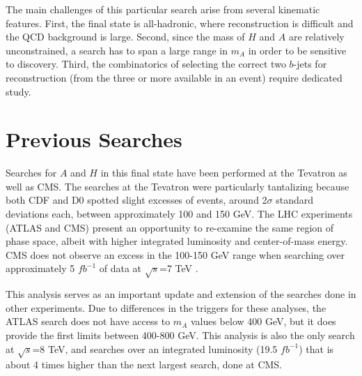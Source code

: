 The main challenges of this particular search arise from several kinematic features. 
First, the final state is all-hadronic, where reconstruction is difficult and 
the QCD background is large.  Second, since the mass of $H$ 
and $A$ are relatively unconstrained, a search has to span a large 
range in $m_A$ in order to be sensitive to discovery.  
Third, the combinatorics of selecting the correct two $b$-jets for reconstruction 
(from the three or more available in an event) require dedicated study.  


\section{Previous Searches}
Searches for $A$ and $H$ in this final state have been performed at the Tevatron
as well as CMS.  The searches at the 
Tevatron were particularly tantalizing because both CDF \cite{CDFbH} and D0 \cite{D0bH} spotted 
slight excesses of events, around 2$\sigma$ standard deviations each, between approximately
100 and 150 GeV.  The LHC experiments (ATLAS and CMS) present an opportunity to
re-examine the same region of phase space, albeit with higher integrated luminosity
and center-of-mass energy.  CMS does not observe an excess in the 100-150 GeV range 
when searching over approximately 5 $fb^{-1}$ of data at $\sqrt{s}$=7 TeV \cite{CMSbH}.

This analysis serves as an important update and extension of the searches done
in other experiments.  Due to differences in the triggers for these analyses,
the ATLAS search does not have access to $m_A$ values below 400 GeV, but it does 
provide the first limits between 400-800 GeV.  This analysis is also the only
search at $\sqrt{s}$=8 TeV, and searches over an integrated luminosity (19.5 $fb^{-1}$)
that is about 4 times higher than the next largest search, done at CMS.


 






